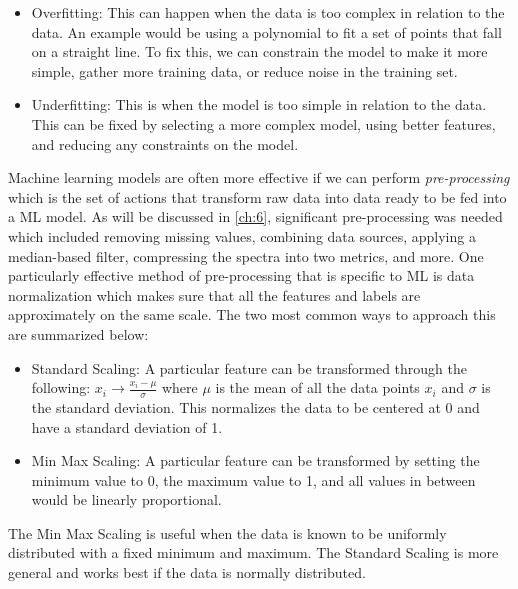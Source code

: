 \begin{itemize}
	\item Overfitting: This can happen when the data is too complex in relation to the data. An example would be using a polynomial to fit a set of points that fall on a straight line. To fix this, we can constrain the model to make it more simple, gather more training data, or reduce noise in the training set.
	\item Underfitting: This is when the model is too simple in relation to the data. This can be fixed by selecting a more complex model, using better features, and reducing any constraints on the model.
\end{itemize} 
Machine learning models are often more effective if we can perform \emph{pre-processing} which is the set of actions that transform raw data into data ready to be fed into a \gls{ML} model. As will be discussed in \autoref{ch:6}, significant pre-processing was needed which included removing missing values, combining data sources, applying a median-based filter, compressing the spectra into two metrics, and more. One particularly effective method of pre-processing that is specific to \gls{ML} is data normalization which makes sure that all the features and labels are approximately on the same scale. The two most common ways to approach this are summarized below: 

\begin{itemize}
	\item Standard Scaling: A particular feature can be transformed through the following: $x_i \rightarrow \frac{x_i - \mu}{\sigma}$ where $\mu$ is the mean of all the data points $x_i$ and $\sigma$ is the standard deviation. This normalizes the data to be centered at 0 and have a standard deviation of 1. 
	\item Min Max Scaling: A particular feature can be transformed by setting the minimum value to 0, the maximum value to 1, and all values in between would be linearly proportional. 
\end{itemize}
The Min Max Scaling is useful when the data is known to be uniformly distributed with a fixed minimum and maximum. The Standard Scaling is more general and works best if the data is normally distributed. 

